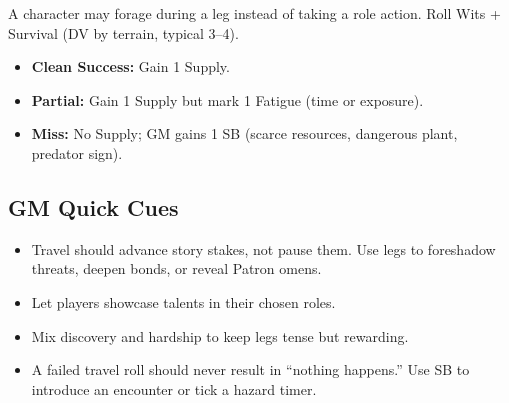 A character may forage during a leg instead of taking a role action. Roll Wits + Survival (DV by terrain, typical 3--4).

\begin{itemize}
  \item \textbf{Clean Success:} Gain 1 Supply.
  \item \textbf{Partial:} Gain 1 Supply but mark 1 Fatigue (time or exposure).
  \item \textbf{Miss:} No Supply; GM gains 1 SB (scarce resources, dangerous plant, predator sign).
\end{itemize}

\subsection{GM Quick Cues}

\begin{itemize}
  \item Travel should advance story stakes, not pause them. Use legs to foreshadow threats, deepen bonds, or reveal Patron omens.
  \item Let players showcase talents in their chosen roles.
  \item Mix discovery and hardship to keep legs tense but rewarding.
  \item A failed travel roll should never result in ``nothing happens.'' Use SB to introduce an encounter or tick a hazard timer.
\end{itemize}
